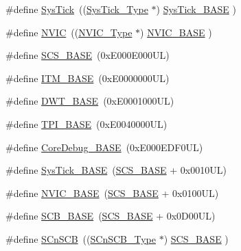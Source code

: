 \begin{DoxyCompactItemize}
\item 
\#define \hyperlink{group___c_m_s_i_s__core__base_gacd96c53beeaff8f603fcda425eb295de}{Sys\+Tick}~((\hyperlink{struct_sys_tick___type}{Sys\+Tick\+\_\+\+Type}   $\ast$)     \hyperlink{group___c_m_s_i_s__core__base_ga58effaac0b93006b756d33209e814646}{Sys\+Tick\+\_\+\+B\+A\+SE}  )
\item 
\#define \hyperlink{group___c_m_s_i_s__core__base_gac8e97e8ce56ae9f57da1363a937f8a17}{N\+V\+IC}~((\hyperlink{struct_n_v_i_c___type}{N\+V\+I\+C\+\_\+\+Type}      $\ast$)     \hyperlink{group___c_m_s_i_s__core__base_gaa0288691785a5f868238e0468b39523d}{N\+V\+I\+C\+\_\+\+B\+A\+SE}     )
\item 
\#define \hyperlink{group___c_m_s_i_s__core__base_ga3c14ed93192c8d9143322bbf77ebf770}{S\+C\+S\+\_\+\+B\+A\+SE}~(0x\+E000\+E000\+U\+L)
\item 
\#define \hyperlink{group___c_m_s_i_s__core__base_gadd76251e412a195ec0a8f47227a8359e}{I\+T\+M\+\_\+\+B\+A\+SE}~(0x\+E0000000\+U\+L)
\item 
\#define \hyperlink{group___c_m_s_i_s__core__base_gafdab534f961bf8935eb456cb7700dcd2}{D\+W\+T\+\_\+\+B\+A\+SE}~(0x\+E0001000\+U\+L)
\item 
\#define \hyperlink{group___c_m_s_i_s__core__base_ga2b1eeff850a7e418844ca847145a1a68}{T\+P\+I\+\_\+\+B\+A\+SE}~(0x\+E0040000\+U\+L)
\item 
\#define \hyperlink{group___c_m_s_i_s__core__base_ga680604dbcda9e9b31a1639fcffe5230b}{Core\+Debug\+\_\+\+B\+A\+SE}~(0x\+E000\+E\+D\+F0\+U\+L)
\item 
\#define \hyperlink{group___c_m_s_i_s__core__base_ga58effaac0b93006b756d33209e814646}{Sys\+Tick\+\_\+\+B\+A\+SE}~(\hyperlink{group___c_m_s_i_s__core__base_ga3c14ed93192c8d9143322bbf77ebf770}{S\+C\+S\+\_\+\+B\+A\+SE} +  0x0010\+U\+L)
\item 
\#define \hyperlink{group___c_m_s_i_s__core__base_gaa0288691785a5f868238e0468b39523d}{N\+V\+I\+C\+\_\+\+B\+A\+SE}~(\hyperlink{group___c_m_s_i_s__core__base_ga3c14ed93192c8d9143322bbf77ebf770}{S\+C\+S\+\_\+\+B\+A\+SE} +  0x0100\+U\+L)
\item 
\#define \hyperlink{group___c_m_s_i_s__core__base_gad55a7ddb8d4b2398b0c1cfec76c0d9fd}{S\+C\+B\+\_\+\+B\+A\+SE}~(\hyperlink{group___c_m_s_i_s__core__base_ga3c14ed93192c8d9143322bbf77ebf770}{S\+C\+S\+\_\+\+B\+A\+SE} +  0x0\+D00\+U\+L)
\item 
\#define \hyperlink{group___c_m_s_i_s__core__base_ga9fe0cd2eef83a8adad94490d9ecca63f}{S\+Cn\+S\+CB}~((\hyperlink{struct_s_cn_s_c_b___type}{S\+Cn\+S\+C\+B\+\_\+\+Type}    $\ast$)     \hyperlink{group___c_m_s_i_s__core__base_ga3c14ed93192c8d9143322bbf77ebf770}{S\+C\+S\+\_\+\+B\+A\+SE}      )

\end{DoxyCompactItemize}
